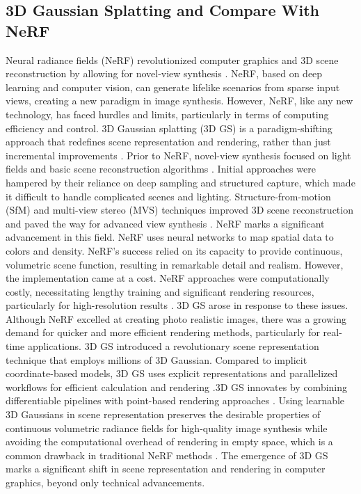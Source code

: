 \subsection{3D Gaussian Splatting and Compare With NeRF}
Neural radiance fields (NeRF) revolutionized computer graphics and 3D scene reconstruction by allowing for novel-view synthesis \cite{mildenhall2021nerf, avidan1997novel}. NeRF, based on deep learning and computer vision, can generate lifelike scenarios from sparse input views, creating a new paradigm in image synthesis.
However, NeRF, like any new technology, has faced hurdles and limits, particularly in terms of computing efficiency and control. 3D Gaussian splatting (3D GS) is a paradigm-shifting approach that redefines scene representation and rendering, rather than just incremental improvements \cite{kerbl20233d}. Prior to NeRF, novel-view synthesis focused on light fields and basic scene reconstruction algorithms \cite{gortler2023lumigraph, buehler2001unstructured}. Initial approaches were hampered by their reliance on deep sampling and structured capture, which made it difficult to handle complicated scenes and lighting. Structure-from-motion (SfM) and multi-view stereo (MVS) techniques improved 3D scene reconstruction and paved the way for advanced view synthesis
 \cite{snavely2006photo, goesele2007multi}. NeRF marks a significant advancement in this field. NeRF uses neural networks to map spatial data to colors and density. NeRF's success relied on its capacity to provide continuous, volumetric scene function, resulting in remarkable detail and realism. However, the implementation came at a cost. NeRF approaches were computationally costly, necessitating lengthy training and significant rendering resources, particularly for high-resolution results \cite{chen2022tensorf,garbin2021fastnerf,reiser2021kilonerf,takikawa2021neural, barron2022mip, muller2022instant}. 3D GS arose in response to these issues. Although NeRF excelled at creating photo realistic images, there was a growing demand for quicker and more efficient rendering methods, particularly for real-time applications. 3D GS introduced a revolutionary scene representation technique that employs millions of 3D Gaussian. Compared to implicit coordinate-based models, 3D GS uses explicit representations and parallelized workflows for efficient calculation and rendering \cite{mildenhall2021nerf,henzler2019escaping, sitzmann2019deepvoxels}.3D GS innovates by combining differentiable pipelines with point-based rendering approaches \cite{pfister2000surfels,wiles2020synsin}. Using learnable 3D Gaussians in scene representation preserves the desirable properties of continuous volumetric radiance fields for high-quality image synthesis while avoiding the computational overhead of rendering in empty space, which is a common drawback in traditional NeRF methods \cite{chen2024survey}. The emergence of 3D GS marks a significant shift in scene representation and rendering in computer graphics, beyond only technical advancements.
